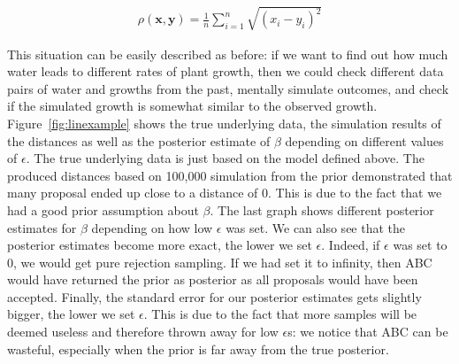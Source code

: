 \documentclass[a4paper,man, natbib]{apa6}
\begin{document}
\begin{align}
\label{eq:eucliddist}
\rho(\mathbf{x},\mathbf{y})=\frac{1}{n}\sum_{i=1}^{n}\sqrt{(x_i-y_i)^2}
\end{align}

This situation can be easily described as before: if we want to find out how much water leads to different rates of plant growth, then we could check different data pairs of water and growths from the past, mentally simulate outcomes, and check if the simulated growth is somewhat similar to the observed growth.
Figure~\ref{fig:linexample} shows the true underlying data, the simulation results of the distances as well as the posterior estimate of $\beta$ depending on different values of $\epsilon$. The true underlying data is just based on the model defined above. The produced distances based on 100,000 simulation from the prior demonstrated that many proposal ended up close to a distance of 0. This is due to the fact that we had a good prior assumption about $\beta$. The last graph shows different posterior estimates for $\beta$ depending on how low $\epsilon$ was set. We can also see that the posterior estimates become more exact, the lower we set $\epsilon$. Indeed, if $\epsilon$ was set to 0, we would get pure rejection sampling. If we had set it to infinity, then ABC would have returned the prior as posterior as all proposals would have been accepted. Finally, the standard error for our posterior estimates gets slightly bigger, the lower we set $\epsilon$. This is due to the fact that more samples will be deemed useless and therefore thrown away for low $\epsilon$s:  we notice that ABC can be wasteful, especially when the prior is far away from the true posterior. 
\end{document}
